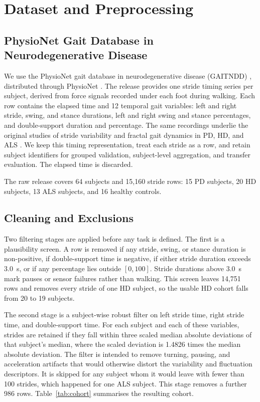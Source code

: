 \documentclass[conference]{IEEEtran}
\begin{document}
\section{Dataset and Preprocessing}
\label{sec:data}

\subsection{PhysioNet Gait Database in Neurodegenerative Disease}
We use the PhysioNet gait database in neurodegenerative disease (GAITNDD) \cite{physionet_gaitndd}, distributed through PhysioNet \cite{goldberger2000physiobank}. The release provides one stride timing series per subject, derived from force signals recorded under each foot during walking. Each row contains the elapsed time and 12 temporal gait variables: left and right stride, swing, and stance durations, left and right swing and stance percentages, and double-support duration and percentage. The same recordings underlie the original studies of stride variability and fractal gait dynamics in PD, HD, and ALS \cite{hausdorff1997fractal,hausdorff1998variability,hausdorff2000als}. We keep this timing representation, treat each stride as a row, and retain subject identifiers for grouped validation, subject-level aggregation, and transfer evaluation. The elapsed time is discarded.

The raw release covers 64 subjects and 15{,}160 stride rows: 15 PD subjects, 20 HD subjects, 13 ALS subjects, and 16 healthy controls.

\subsection{Cleaning and Exclusions}
Two filtering stages are applied before any task is defined. The first is a plausibility screen. A row is removed if any stride, swing, or stance duration is non-positive, if double-support time is negative, if either stride duration exceeds 3.0~s, or if any percentage lies outside $[0,100]$. Stride durations above 3.0~s mark pauses or sensor failures rather than walking. This screen leaves 14{,}751 rows and removes every stride of one HD subject, so the usable HD cohort falls from 20 to 19 subjects.

The second stage is a subject-wise robust filter on left stride time, right stride time, and double-support time. For each subject and each of these variables, strides are retained if they fall within three scaled median absolute deviations of that subject's median, where the scaled deviation is 1.4826 times the median absolute deviation. The filter is intended to remove turning, pausing, and acceleration artifacts that would otherwise distort the variability and fluctuation descriptors. It is skipped for any subject whom it would leave with fewer than 100 strides, which happened for one ALS subject. This stage removes a further 986 rows. Table~\ref{tab:cohort} summarises the resulting cohort.
\end{document}
